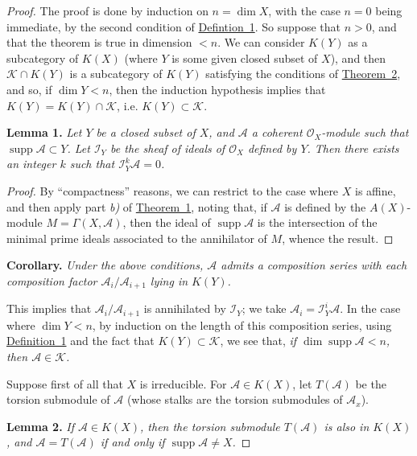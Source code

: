 \documentclass{article}
\newenvironment{itenv}[1]
  {\smallskip\noindent\textbf{#1.}\itshape}
  {\smallskip}
\newcommand{\scr}[1]{{\mathscr{#1}}}
\renewcommand{\cal}[1]{{\mathcal{#1}}}
\newcommand{\supp}{\operatorname{supp}}
\newcommand{\oldpage}[1]{\marginpar{\footnotesize$\Big\vert$ \textit{p.~#1}}}
\begin{document}
\begin{proof}
  The proof is done by induction on $n=\dim X$, with the case $n=0$ being immediate, by the second condition of \hyperref[definition1]{Defintion~1}.
  So suppose that $n>0$, and that the theorem is true in dimension $<n$.
  We can consider $K(Y)$ as a subcategory of $K(X)$ (where $Y$ is some given closed subset of $X$), and then $\cal{K}\cap K(Y)$ is a subcategory of $K(Y)$ satisfying the conditions of \hyperref[theorem2]{Theorem~2}, and so, if $\dim Y<n$, then the induction hypothesis implies that $K(Y)=K(Y)\cap\cal{K}$, i.e. $K(Y)\subset\cal{K}$.

  \begin{itenv}{Lemma 1}
  \label{lemma1}
    Let $Y$ be a closed subset of $X$, and $\scr{A}$ a coherent $\scr{O}_X$-module such that $\supp\scr{A}\subset Y$.
    Let $\scr{I}_Y$ be the sheaf of ideals of $\scr{O}_X$ defined by $Y$.
    Then there exists an integer $k$ such that $\scr{I}_Y^k\scr{A}=0$.
  \end{itenv}

  \begin{proof}
    By ``compactness'' reasons, we can restrict to the case where $X$ is affine, and then apply part \emph{b)} of \hyperref[theorem1]{Theorem~1}, noting that, if $\scr{A}$ is defined by the $A(X)$-module $M=\Gamma(X,\scr{A})$, then the ideal of $\supp\scr{A}$ is the intersection of the minimal prime ideals associated to the annihilator of $M$, whence the result.
  \end{proof}

  \begin{itenv}{Corollary}
  \label{corollary-1}
    Under the above conditions, $\scr{A}$ admits a composition series with each composition factor $\scr{A}_i/\scr{A}_{i+1}$ lying in $K(Y)$.
  \end{itenv}

  This implies that $\scr{A}_i/\scr{A}_{i+1}$ is annihilated by $\scr{I}_Y$;
  we take $\scr{A}_i=\scr{I}_Y^i\scr{A}$.
  In the case where $\dim Y<n$, by induction on the length of
  \oldpage{2-03}
  this composition series, using \hyperref[definition1]{Definition~1} and the fact that $K(Y)\subset\cal{K}$, we see that, \emph{if $\dim\supp\scr{A}<n$, then $\scr{A}\in\cal{K}$.}

  Suppose first of all that $X$ is irreducible.
  For $\scr{A}\in K(X)$, let $T(\scr{A})$ be the torsion submodule of $\scr{A}$ (whose stalks are the torsion submodules of $\scr{A}_x$).

  \begin{itenv}{Lemma 2}
  \label{lemma2}
    If $\scr{A}\in K(X)$, then the torsion submodule $T(\scr{A})$ is also in $K(X)$, and $\scr{A}=T(\scr{A})$ if and only if $\supp\scr{A}\neq X$.
  \end{itenv}


\end{proof}
\end{document}
